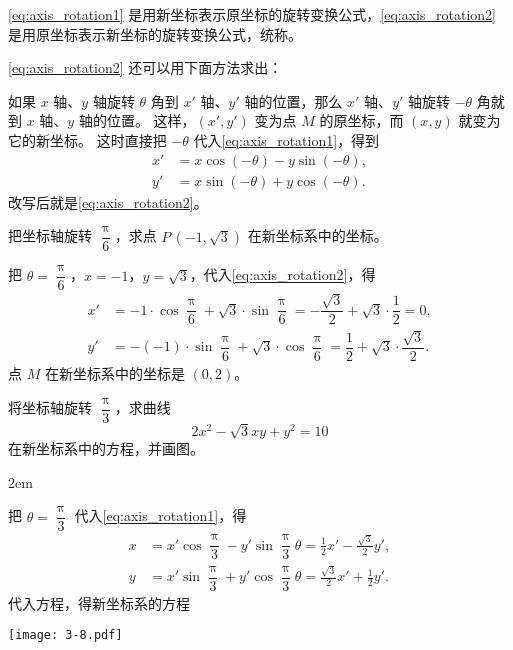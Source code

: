 \cref{eq:axis_rotation1} 是用新坐标表示原坐标的旋转变换公式，\cref{eq:axis_rotation2} 是用原坐标表示新坐标的旋转变换公式，统称。

\cref{eq:axis_rotation2} 还可以用下面方法求出：

如果 $x$ 轴、$y$ 轴旋转 $\theta$ 角到 $x'$ 轴、$y'$ 轴的位置，那么 $x'$ 轴、$y'$ 轴旋转 $-\theta$ 角就到 $x$ 轴、$y$ 轴的位置。
这样，$(x',y')$ 变为点 $M$ 的原坐标，而 $(x,y)$ 就变为它的新坐标。
这时直接把 $-\theta$ 代入\cref{eq:axis_rotation1}，得到
\begin{align*}
  x' &= x\cos(-\theta)-y\sin(-\theta),\\
  y' &= x\sin(-\theta)+y\cos(-\theta).
\end{align*}
改写后就是\cref{eq:axis_rotation2}。

\begin{example}
  把坐标轴旋转 $\dfrac{\uppi}{6}$，求点 $P\,(-1,\sqrt{3})$ 在新坐标系中的坐标。
\end{example}
\begin{solution}
  把 $\theta=\dfrac{\uppi}{6}$，$x=-1$，$y=\sqrt{3}$，代入\cref{eq:axis_rotation2}，得
  \begin{align*}
    x' &= -1\cdot\cos\dfrac{\uppi}{6}+\sqrt{3}\cdot\sin\dfrac{\uppi}{6}=-\dfrac{\sqrt{3}}{2}+\sqrt{3}\cdot\dfrac{1}{2}=0,\\
    y' &= -(-1)\cdot\sin\dfrac{\uppi}{6}+\sqrt{3}\cdot\cos\dfrac{\uppi}{6}=\dfrac{1}{2}+\sqrt{3}\cdot\dfrac{\sqrt{3}}{2}.
  \end{align*}
  点 $M$ 在新坐标系中的坐标是 $(0,2)$。
\end{solution}

\begin{example}\label{exam:reduction}
  将坐标轴旋转 $\dfrac{\uppi}{3}$，求曲线
  \[2x^2-\sqrt{3}xy+y^2=10\]
  在新坐标系中的方程，并画图。
\end{example}
\begin{minipage}{0.65\linewidth}\parindent2em
\begin{solution}
  把 $\theta=\dfrac{\uppi}{3}$ 代入\cref{eq:axis_rotation1}，得
  \begin{align*}
    x &= x'\cos\dfrac{\uppi}{3}-y'\sin\dfrac{\uppi}{3}\theta=\frac{1}{2}x'-\frac{\sqrt{3}}{2}y',\\
    y &= x'\sin\dfrac{\uppi}{3}+y'\cos\dfrac{\uppi}{3}\theta=\frac{\sqrt{3}}{2}x'+\frac{1}{2}y'.
  \end{align*}
  代入方程，得新坐标系的方程
\end{solution}
\end{minipage}\hfill
\begin{minipage}{0.3\linewidth}\centering
\begin{figurehere}
  \texttt{[image: 3-8.pdf]}
  \caption{}\label{fig:3-8}
\end{figurehere}
\end{minipage}

